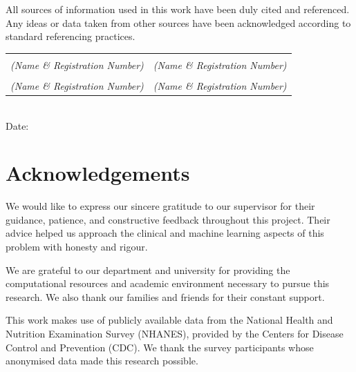 \documentclass[12pt,a4paper,oneside]{report}
\begin{document}
All sources of information used in this work have been duly cited and referenced. Any ideas or data taken from other sources have been acknowledged according to standard referencing practices.

\vspace{1.5cm}
\begin{flushleft}
\begin{tabular}{p{7cm} p{7cm}}
\underline{\hspace{6cm}} & \underline{\hspace{6cm}} \\
\textit{(Name \& Registration Number)} & \textit{(Name \& Registration Number)} \\[20pt]
\underline{\hspace{6cm}} & \underline{\hspace{6cm}} \\
\textit{(Name \& Registration Number)} & \textit{(Name \& Registration Number)} \\[12pt]
\end{tabular}\\
Date: \underline{\hspace{3cm}}
\end{flushleft}

\clearpage
\chapter*{Acknowledgements}

We would like to express our sincere gratitude to our supervisor for their guidance, patience, and constructive feedback throughout this project. Their advice helped us approach the clinical and machine learning aspects of this problem with honesty and rigour.

We are grateful to our department and university for providing the computational resources and academic environment necessary to pursue this research. We also thank our families and friends for their constant support.

This work makes use of publicly available data from the National Health and Nutrition Examination Survey (NHANES), provided by the Centers for Disease Control and Prevention (CDC). We thank the survey participants whose anonymised data made this research possible.

\clearpage
\end{document}
